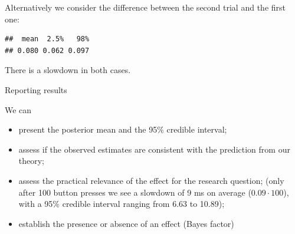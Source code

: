\documentclass[12pt,ignorenonframetext,aspectratio=169]{beamer}
\newenvironment{Shaded}{\begin{snugshade}}{\end{snugshade}}
\newcommand{\CommentTok}[1]{\textcolor[rgb]{0.56,0.35,0.01}{\textit{#1}}}
\newcommand{\DataTypeTok}[1]{\textcolor[rgb]{0.13,0.29,0.53}{#1}}
\newcommand{\DecValTok}[1]{\textcolor[rgb]{0.00,0.00,0.81}{#1}}
\newcommand{\FloatTok}[1]{\textcolor[rgb]{0.00,0.00,0.81}{#1}}
\newcommand{\KeywordTok}[1]{\textcolor[rgb]{0.13,0.29,0.53}{\textbf{#1}}}
\newcommand{\NormalTok}[1]{#1}
\newcommand{\OperatorTok}[1]{\textcolor[rgb]{0.81,0.36,0.00}{\textbf{#1}}}
\newcommand{\StringTok}[1]{\textcolor[rgb]{0.31,0.60,0.02}{#1}}
\providecommand{\tightlist}{%
  \setlength{\itemsep}{0pt}\setlength{\parskip}{0pt}}
\begin{document}
\begin{frame}[fragile]

Alternatively we consider the difference between the second trial and the first one:

\scriptsize

\begin{Shaded}
\end{Shaded}

\begin{verbatim}
##  mean  2.5%   98% 
## 0.080 0.062 0.097
\end{verbatim}

\normalsize

There is a slowdown in both cases.

\end{frame}

\begin{frame}{Reporting results}
\protect\hypertarget{reporting-results}{}

\begin{block}{We can}

\begin{itemize}
\tightlist
\item
  present the posterior mean and the 95\% credible interval;
\item
  assess if the observed estimates are consistent with the prediction from our theory;
\item
  assess the practical relevance of the effect for the research question; (only after 100 button presses we see a slowdown of 9 ms on average (\(0.09 \cdot 100\)), with a 95\% credible interval ranging from 6.63 to 10.89);
\item
  establish the presence or absence of an effect (Bayes factor)
\end{itemize}

\end{block}

\end{frame}
\end{document}
